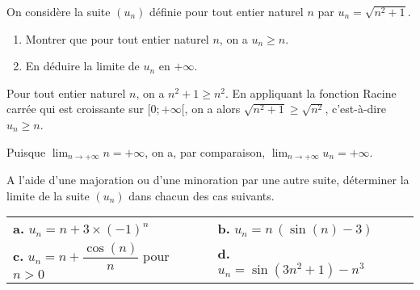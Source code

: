 \documentclass[11pt,fleqn, openany]{book} %
\begin{document}
\begin{exercise}[topic=lim11]On considère la suite $(u_n)$ définie pour tout entier naturel $n$ par $u_n=\sqrt{n^2+1}$.
\begin{enumerate}
\item Montrer que pour tout entier naturel $n$, on a $u_n \geqslant n$.
\item En déduire la limite de $u_n$ en $+\infty$.
\end{enumerate}\end{exercise}

\begin{solution}Pour tout entier naturel $n$, on a $n^2+1 \geqslant n^2$. En appliquant la fonction Racine carrée qui est croissante sur $[0;+\infty[$, on a alors $\sqrt{n^2+1} \geqslant \sqrt{n^2}$, c'est-à-dire $u_n \geqslant n$.

Puisque $\displaystyle\lim_{n \to + \infty} n=+\infty$, on a, par comparaison, $\displaystyle\lim_{n \to + \infty}u_n=+\infty$.\end{solution}




\begin{exercise}[topic=lim11]A l'aide d'une majoration ou d'une minoration par une autre suite, déterminer la limite de la suite $(u_n)$ dans chacun des cas suivants.
\renewcommand{\arraystretch}{2.2}
\begin{center}
\begin{tabularx}{\linewidth}{XXXX}
\textbf{a.} $ u_n = n+3\times (-1)^n$ & \textbf{b.} $ u_n=n\,(\sin(n)-3)$ \\
\textbf{c.} $ u_n = n+\dfrac{\cos(n)}{n}$ pour $n>0$ & \textbf{d.} $u_n=\sin(3n^2+1)-n^3$ \\
\end{tabularx}
\end{center}\end{exercise}
\end{document}
